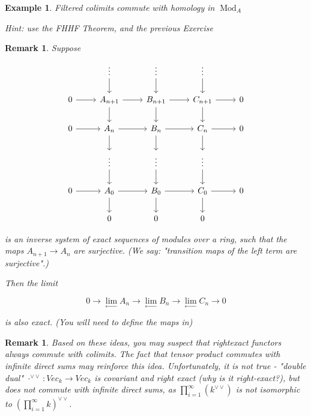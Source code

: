 \documentclass{article}
\newtheorem{example}[theorem]{Example}
\newtheorem{remark}[theorem]{Remark}
\begin{document}
\begin{example}
    Filtered colimits commute with homology in $\operatorname{Mod}_{A}$
    
    Hint: use the FHHF Theorem, and the previous Exercise
\end{example}
\begin{remark}
    Suppose
    \[\begin{tikzcd}
	& \vdots & \vdots & \vdots \\
	0 & {A_{n+1}} & {B_{n+1}} & {C_{n+1}} & 0 \\
	0 & {A_{n}} & {B_{n}} & {C_{n}} & 0 \\
	& \vdots & \vdots & \vdots \\
	0 & {A_{0}} & {B_{0}} & {C_{0}} & 0 \\
	& 0 & 0 & 0
	\arrow[from=1-2, to=2-2]
	\arrow[from=2-2, to=3-2]
	\arrow[from=3-2, to=4-2]
	\arrow[from=4-2, to=5-2]
	\arrow[from=5-2, to=6-2]
	\arrow[from=5-1, to=5-2]
	\arrow[from=2-2, to=2-3]
	\arrow[from=2-1, to=2-2]
	\arrow[from=3-1, to=3-2]
	\arrow[from=5-2, to=5-3]
	\arrow[from=3-3, to=4-3]
	\arrow[from=4-3, to=5-3]
	\arrow[from=3-2, to=3-3]
	\arrow[from=1-3, to=2-3]
	\arrow[from=2-3, to=3-3]
	\arrow[from=5-3, to=6-3]
	\arrow[from=2-3, to=2-4]
	\arrow[from=3-3, to=3-4]
	\arrow[from=2-4, to=3-4]
	\arrow[from=1-4, to=2-4]
	\arrow[from=2-4, to=2-5]
	\arrow[from=3-4, to=3-5]
	\arrow[from=5-3, to=5-4]
	\arrow[from=3-4, to=4-4]
	\arrow[from=4-4, to=5-4]
	\arrow[from=5-4, to=5-5]
	\arrow[from=5-4, to=6-4]
\end{tikzcd}\]
    
    is an inverse system of exact sequences of modules over a ring, such that the maps $A_{n+1} \rightarrow A_{n}$ are surjective. (We say: "transition maps of the left term are surjective".) 
    
    Then the limit

$$
0 \longrightarrow \lim _{\longleftarrow} A_{n} \longrightarrow \lim _{\longleftarrow} B_{n} \longrightarrow \lim _{\longleftarrow} C_{n} \longrightarrow 0
$$

is also exact. (You will need to define the maps in)
\end{remark}
\begin{remark}
Based on these ideas, you may suspect that rightexact functors always commute with colimits. The fact that tensor product commutes with infinite direct sums may reinforce this idea. Unfortunately, it is not true - "double dual" $\cdot^{\vee \vee} : Vec_{k} \rightarrow Vec_{k}$ is covariant and right exact (why is it right-exact?), but does not commute with infinite direct sums, as $\prod_{i=1}^{\infty}\left(k^{\vee \vee}\right)$ is not isomorphic to $\left(\prod_{i=1}^{\infty} k\right)^{\vee \vee}$.
\end{remark}
\end{document}
